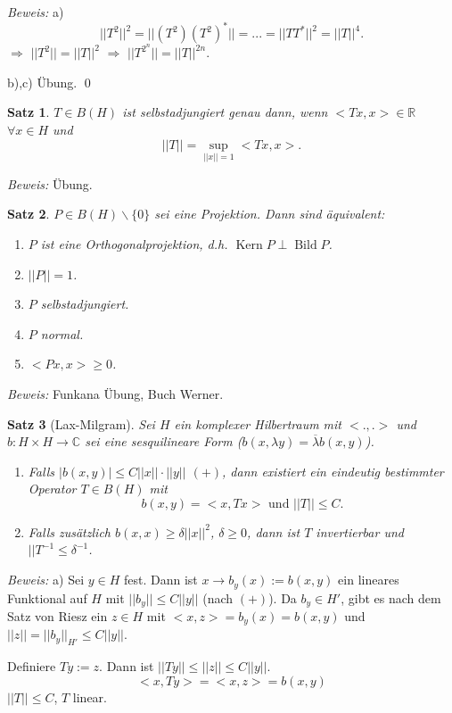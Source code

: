 \documentclass[12pt]{extreport} %
\newtheorem{Satz}{Satz}[subsection]
\DeclareMathOperator{\Kern}{Kern}
\DeclareMathOperator{\Bild}{Bild}
\numberwithin{equation}{section}
\newcommand{\C}{\mathbb{C}} %
\newcommand{\R}{\mathbb{R}} %
\newcommand{\m}{\cdot}
\newcommand{\Bew}{\emph{Beweis: }}
\begin{document}
	\Bew a) $$||T^2||^2 = ||(T^2)(T^2)^*|| = ...= ||T T^*||^2 = ||T||^4.$$
	$\Rightarrow$ $||T^2|| = ||T||^2$ $\Rightarrow$ $ ||T^{2^n}|| = ||T||^{2n}$.

	b),c) Übung.
	\qed
	
	\begin{Satz}
		$T\in B(H)$ ist selbstadjungiert genau dann, wenn $<Tx,x>\in \R$ $\forall x\in H$ und $$||T|| = \sup_{||x||= 1}<Tx,x>.$$
	\end{Satz}
	
	\Bew Übung.
	
	\begin{Satz}
		$P\in B(H)\backslash\{0\}$ sei eine Projektion. Dann sind äquivalent:
		\begin{enumerate}
			\item[a)] $P$ ist eine Orthogonalprojektion, d.h. $\Kern P\perp \Bild P$.
			\item[b)] $||P|| = 1$.
			\item[c)] $P$ selbstadjungiert.
			\item[d)] $P$ normal.
			\item[e)] $<Px,x>\geq 0$.
		\end{enumerate}
	\end{Satz}
	
	\Bew Funkana Übung, Buch Werner.
	
	\begin{Satz}[Lax-Milgram]
		Sei $H$ ein komplexer Hilbertraum mit $<.,.>$ und $b:H\times H\rightarrow\C$ sei eine sesquilineare Form ($b(x,\lambda y)= \overline{\lambda}b(x,y)$).
		\begin{enumerate}
			\item[a)] Falls $|b(x,y)|\leq C||x||\m||y||$ $(+)$, dann existiert ein eindeutig bestimmter Operator $T\in B(H)$ mit 
			$$b(x,y) = <x,Tx>\text{ und } ||T||\leq C.$$
			\item[b)] Falls zusätzlich $b(x,x)\geq \delta||x||^2$, $\delta\geq 0$, dann ist $T$ invertierbar und $||T^{-1} \leq \delta^{-1}$.
		\end{enumerate}
	\end{Satz}
	
	\Bew a) Sei $y\in H$ fest. Dann ist $x\rightarrow b_y(x) := b(x,y)$ ein lineares Funktional auf $H$ mit $||b_y||\leq C||y||$ (nach $(+)$). Da $b_y\in H'$, gibt es nach dem Satz von Riesz ein $z\in H$ mit $<x,z> = b_y(x) = b(x,y)$ und $||z|| = ||b_y||_{H'}\leq C||y||$.
	
	Definiere $Ty:= z$. Dann ist $||Ty||\leq ||z||\leq C||y||$.
	$$<x,Ty> = <x,z>= b(x,y)$$
	$||T||\leq C$, $T$ linear.
	
\end{document}
